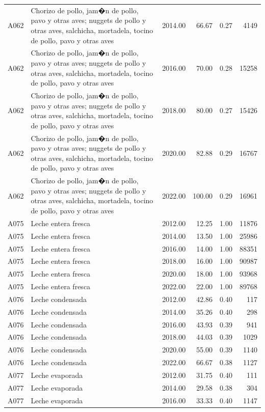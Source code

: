 \begin{table}[ht]
\begin{tabular}{llrrrr}
  A062 & Chorizo de pollo, jam�n de pollo, pavo y otras aves; nuggets de pollo y otras aves, salchicha, mortadela, tocino de pollo, pavo y otras aves & 2014.00 & 66.67 & 0.27 & 4149 \\ 
  A062 & Chorizo de pollo, jam�n de pollo, pavo y otras aves; nuggets de pollo y otras aves, salchicha, mortadela, tocino de pollo, pavo y otras aves & 2016.00 & 70.00 & 0.28 & 15258 \\ 
  A062 & Chorizo de pollo, jam�n de pollo, pavo y otras aves; nuggets de pollo y otras aves, salchicha, mortadela, tocino de pollo, pavo y otras aves & 2018.00 & 80.00 & 0.27 & 15426 \\ 
  A062 & Chorizo de pollo, jam�n de pollo, pavo y otras aves; nuggets de pollo y otras aves, salchicha, mortadela, tocino de pollo, pavo y otras aves & 2020.00 & 82.88 & 0.29 & 16767 \\ 
  A062 & Chorizo de pollo, jam�n de pollo, pavo y otras aves; nuggets de pollo y otras aves, salchicha, mortadela, tocino de pollo, pavo y otras aves & 2022.00 & 100.00 & 0.29 & 16961 \\ 
  A075 & Leche entera fresca & 2012.00 & 12.25 & 1.00 & 11876 \\ 
  A075 & Leche entera fresca & 2014.00 & 13.50 & 1.00 & 25986 \\ 
  A075 & Leche entera fresca & 2016.00 & 14.00 & 1.00 & 88351 \\ 
  A075 & Leche entera fresca & 2018.00 & 16.00 & 1.00 & 90987 \\ 
  A075 & Leche entera fresca & 2020.00 & 18.00 & 1.00 & 93968 \\ 
  A075 & Leche entera fresca & 2022.00 & 22.00 & 1.00 & 89768 \\ 
  A076 & Leche condensada & 2012.00 & 42.86 & 0.40 & 117 \\ 
  A076 & Leche condensada & 2014.00 & 35.26 & 0.40 & 298 \\ 
  A076 & Leche condensada & 2016.00 & 43.93 & 0.39 & 941 \\ 
  A076 & Leche condensada & 2018.00 & 44.03 & 0.39 & 1029 \\ 
  A076 & Leche condensada & 2020.00 & 55.00 & 0.39 & 1140 \\ 
  A076 & Leche condensada & 2022.00 & 66.67 & 0.38 & 1127 \\ 
  A077 & Leche evaporada & 2012.00 & 31.75 & 0.40 & 111 \\ 
  A077 & Leche evaporada & 2014.00 & 29.58 & 0.38 & 304 \\ 
  A077 & Leche evaporada & 2016.00 & 33.33 & 0.40 & 1147 \\ 

\end{tabular}
\end{table}
